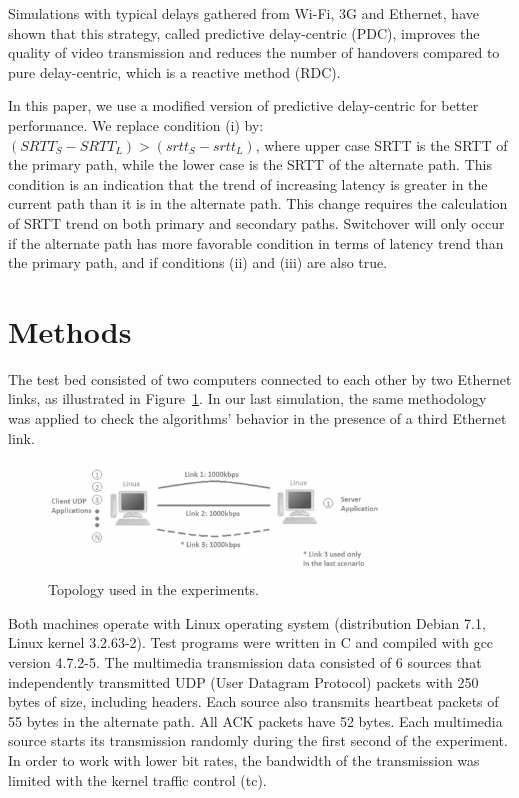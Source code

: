 \documentclass[letterpaper,10pt,oneside,conference,final]{sbrt2015}
\begin{document}
Simulations with typical delays gathered from Wi-Fi, 3G and Ethernet, have shown that this strategy, called predictive delay-centric (PDC), improves the quality of video transmission and reduces the number of handovers compared to pure delay-centric, which is a reactive method (RDC).

In this paper, we use a modified version of predictive delay-centric for better performance. We replace condition (i) by:
${(SRTT_S - SRTT_L) > (srtt_S - srtt_L)}$, where upper case SRTT is the SRTT of the primary path, while the lower case is the SRTT of the alternate path. This condition is an indication that the trend of increasing latency is greater in the current path than it is in the alternate path. This change requires the calculation of SRTT trend on both primary and secondary paths. Switchover will only occur if the alternate path has more favorable condition in terms of latency trend than the primary path, and if conditions (ii) and (iii) are also true.

\section{Methods}

The test bed consisted of two computers connected to each other by two Ethernet links, as illustrated in Figure~\ref{topology}. In our last simulation, the same methodology was applied to check the algorithms' behavior in the presence of a third Ethernet link.

\begin{figure}[ht!]
\centering
\includegraphics[width=8.8cm,height=3cm]{figura1}
\caption{Topology used in the experiments.}
\label{topology}
\end{figure}

Both machines operate with Linux operating system (distribution Debian 7.1, Linux kernel 3.2.63-2). Test programs were written in C and compiled with gcc version 4.7.2-5. The multimedia transmission data consisted of 6 sources that independently transmitted UDP (User Datagram Protocol) packets with 250 bytes of size, including headers. Each source also transmits heartbeat packets of 55 bytes in the alternate path. All ACK packets have 52 bytes. Each multimedia source starts its transmission randomly during the first second of the experiment. In order to work with lower bit rates, the bandwidth of the transmission was limited with the kernel traffic control (tc). 
\end{document}
